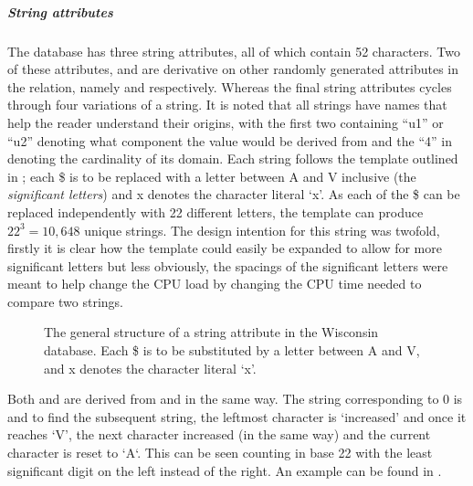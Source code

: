 \subparagraph{String attributes} The database has three string attributes, all
of which contain 52 characters. Two of these attributes, 
and  are derivative on other randomly generated attributes
in the relation, namely  and 
respectively. Whereas the final string attributes  cycles
through four variations of a string. It is noted that all strings have names
that help the reader understand their origins, with the first two containing
``u1'' or ``u2'' denoting what component the value would be derived from and the
``4'' in  denoting the cardinality of its domain. Each string follows
the template outlined in ; each \$ is to be
replaced with a letter between A and V inclusive (the \emph{significant
letters}) and x denotes the character literal
`x'. As each of the \$ can be replaced independently with 22 different
letters, the template can produce $22^3 = 10,648$ unique strings. The design
intention for this string was twofold, firstly it is clear how the template
could easily be expanded to allow for more significant letters but less
obviously, the spacings of the significant letters were meant to help change the
CPU load by changing the CPU time needed to compare two strings.

\begin{figure}[h]
    \centering
    \WisconsinUStringDef 
    \caption{The general structure of a string attribute in the Wisconsin
        database. Each \$ is to be substituted by a letter between A and V, and x
    denotes the character literal `x'.}
    \label{fig:WisconsinStringTemplate}
\end{figure}

Both  and  are derived from
 and  in the same way. The string
corresponding to 0 is  and to find the
subsequent string, the leftmost character is `increased' and once it reaches `V',
the next character increased (in the same way) and the current character is
reset to `A`. This can be seen counting in base 22 with the least significant
digit on the left instead of the right. An example can be found in
.

